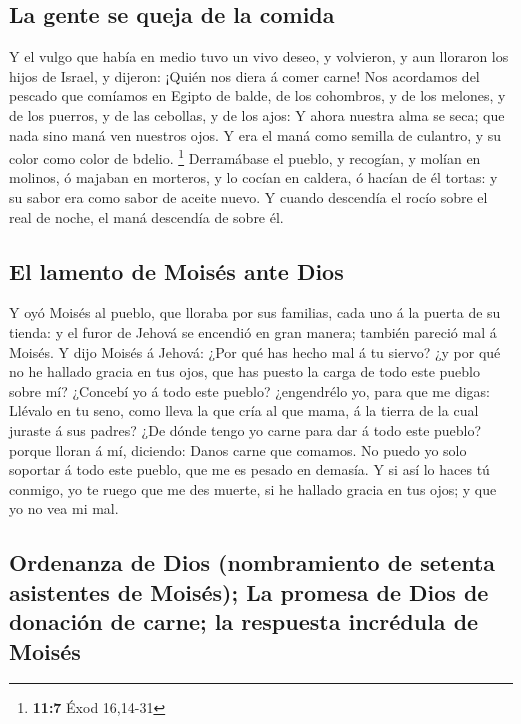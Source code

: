 \hypertarget{la-gente-se-queja-de-la-comida}{%
\subsection{La gente se queja de la
comida}\label{la-gente-se-queja-de-la-comida}}

 Y el vulgo que había en medio tuvo un vivo deseo, y
volvieron, y aun lloraron los hijos de Israel, y dijeron: ¡Quién nos
diera á comer carne!  Nos acordamos del pescado que comíamos
en Egipto de balde, de los cohombros, y de los melones, y de los
puerros, y de las cebollas, y de los ajos:  Y ahora nuestra
alma se seca; que nada sino maná ven nuestros ojos.  Y era
el maná como semilla de culantro, y su color como color de bdelio.
\footnote{\textbf{11:7} Éxod 16,14-31}  Derramábase el
pueblo, y recogían, y molían en molinos, ó majaban en morteros, y lo
cocían en caldera, ó hacían de él tortas: y su sabor era como sabor de
aceite nuevo.  Y cuando descendía el rocío sobre el real de
noche, el maná descendía de sobre él.

\hypertarget{el-lamento-de-moisuxe9s-ante-dios}{%
\subsection{El lamento de Moisés ante
Dios}\label{el-lamento-de-moisuxe9s-ante-dios}}

 Y oyó Moisés al pueblo, que lloraba por sus familias, cada
uno á la puerta de su tienda: y el furor de Jehová se encendió en gran
manera; también pareció mal á Moisés.  Y dijo Moisés á
Jehová: ¿Por qué has hecho mal á tu siervo? ¿y por qué no he hallado
gracia en tus ojos, que has puesto la carga de todo este pueblo sobre
mí?  ¿Concebí yo á todo este pueblo? ¿engendrélo yo, para
que me digas: Llévalo en tu seno, como lleva la que cría al que mama, á
la tierra de la cual juraste á sus padres?  ¿De dónde tengo
yo carne para dar á todo este pueblo? porque lloran á mí, diciendo:
Danos carne que comamos.  No puedo yo solo soportar á todo
este pueblo, que me es pesado en demasía.  Y si así lo
haces tú conmigo, yo te ruego que me des muerte, si he hallado gracia en
tus ojos; y que yo no vea mi mal.

\hypertarget{ordenanza-de-dios-nombramiento-de-setenta-asistentes-de-moisuxe9s-la-promesa-de-dios-de-donaciuxf3n-de-carne-la-respuesta-incruxe9dula-de-moisuxe9s}{%
\subsection{Ordenanza de Dios (nombramiento de setenta asistentes de
Moisés); La promesa de Dios de donación de carne; la respuesta incrédula
de
Moisés}\label{ordenanza-de-dios-nombramiento-de-setenta-asistentes-de-moisuxe9s-la-promesa-de-dios-de-donaciuxf3n-de-carne-la-respuesta-incruxe9dula-de-moisuxe9s}}

